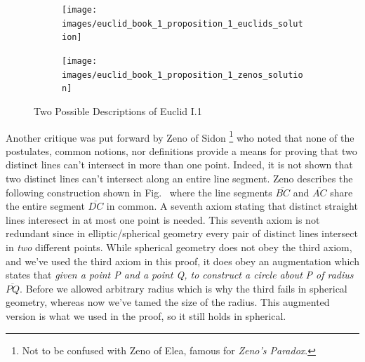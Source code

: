         \begin{figure}[H]
            \centering
            \begin{subfigure}[b]{0.49\textwidth}
                \centering
                \captionsetup{type=figure}
                \texttt{[image: images/euclid\_book\_1\_proposition\_1\_euclids\_solution]}
                \label{fig:Euclid_I_1}
            \end{subfigure}
            \begin{subfigure}[b]{0.49\textwidth}
                \centering
                \captionsetup{type=figure}
                \texttt{[image: images/euclid\_book\_1\_proposition\_1\_zenos\_solution]}
                \label{fig:Zeno_Euclid_I_1}
            \end{subfigure}
            \caption{Two Possible Descriptions of Euclid I.1}
        \end{figure}
        Another critique was put forward by Zeno of Sidon%
        \footnote{%
            Not to be confused with Zeno of Elea, famous for
            \textit{Zeno's Paradox}.
        }
        who noted that none of the postulates, common notions, nor definitions
        provide a means for proving that two distinct lines can't intersect in
        more than one point. Indeed, it is not shown that two distinct lines
        can't intersect along an entire line segment. Zeno describes the
        following construction shown in Fig.~ where
        the line segments $\overline{BC}$ and $\overline{AC}$ share the entire
        segment $\overline{DC}$ in common. A seventh axiom stating that distinct
        straight lines interesect in at most one point is needed.
        This seventh axiom is not redundant since in elliptic/spherical geometry
        every pair of distinct lines intersect in \textit{two} different points.
        While spherical geometry does not obey the third axiom, and we've used
        the third axiom in this proof, it does obey an augmentation which states
        that \textit{given a point P and a point Q, to construct a circle about}
        \textit{P of radius} $\overline{PQ}$. Before we allowed arbitrary radius
        which is why the third fails in spherical geometry, whereas now we've
        tamed the size of the radius. This augmented version is what we used in
        the proof, so it still holds in spherical.%
